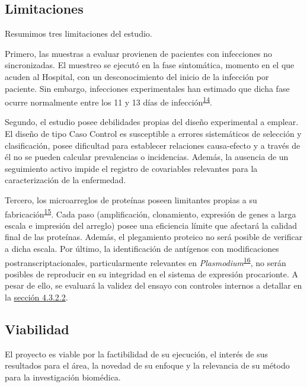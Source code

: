 \documentclass[]{article}
\begin{document}
\subsection{Limitaciones}\label{limit}

Resumimos tres limitaciones del estudio.

Primero, las muestras a evaluar provienen de pacientes con infecciones
no sincronizadas. El muestreo se ejecutó en la fase sintomática, momento
en el que acuden al Hospital, con un desconocimiento del inicio de la
infección por paciente. Sin embargo, infecciones experimentales han
estimado que dicha fase ocurre normalmente entre los 11 y 13 días de
infección\textsuperscript{\protect\hyperlink{ref-arevalo2014}{14}}.

Segundo, el estudio posee debilidades propias del diseño experimental a
emplear. El diseño de tipo Caso Control es susceptible a errores
sistemáticos de selección y clasificación, posee dificultad para
establecer relaciones causa-efecto y a través de él no se pueden
calcular prevalencias o incidencias. Además, la ausencia de un
seguimiento activo impide el registro de covariables relevantes para la
caracterización de la enfermedad.

Tercero, los microarreglos de proteínas poseen limitantes propias a su
fabricación\textsuperscript{\protect\hyperlink{ref-vigil2010}{15}}. Cada
paso (amplificación, clonamiento, expresión de genes a larga escala e
impresión del arreglo) posee una eficiencia límite que afectará la
calidad final de las proteínas. Además, el plegamiento proteico no será
posible de verificar a dicha escala. Por último, la identificación de
antígenos con modificaciones postranscriptacionales, particularmente
relevantes en
\emph{Plasmodium}\textsuperscript{\protect\hyperlink{ref-leroch2009postmod}{16}},
no serán posibles de reproducir en su integridad en el sistema de
expresión procarionte. A pesar de ello, se evaluará la validez del
ensayo con controles internos a detallar en la
\protect\hyperlink{validez}{sección 4.3.2.2}.

\subsection{Viabilidad}\label{viabilidad}

El proyecto es viable por la factibilidad de su ejecución, el interés de
sus resultados para el área, la novedad de su enfoque y la relevancia de
su método para la investigación biomédica.
\end{document}
